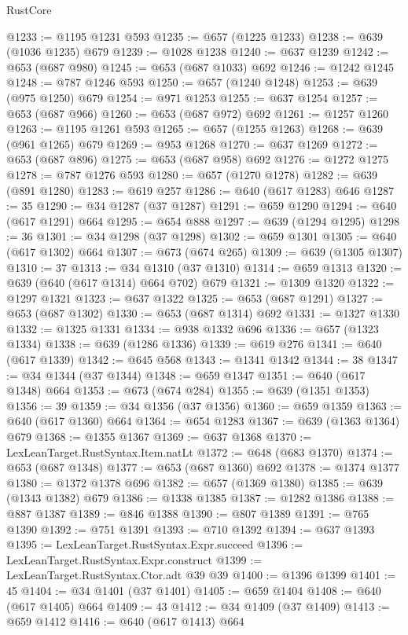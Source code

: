 \begin{lexlean}{RustCore}
\begin{coremodule}
@1233 := @1195 @1231 @593
@1235 := @657 (@1225 @1233)
@1238 := @639 (@1036 @1235) @679
@1239 := @1028 @1238
@1240 := @637 @1239
@1242 := @653 (@687 @980)
@1245 := @653 (@687 @1033) @692
@1246 := @1242 @1245
@1248 := @787 @1246 @593
@1250 := @657 (@1240 @1248)
@1253 := @639 (@975 @1250) @679
@1254 := @971 @1253
@1255 := @637 @1254
@1257 := @653 (@687 @966)
@1260 := @653 (@687 @972) @692
@1261 := @1257 @1260
@1263 := @1195 @1261 @593
@1265 := @657 (@1255 @1263)
@1268 := @639 (@961 @1265) @679
@1269 := @953 @1268
@1270 := @637 @1269
@1272 := @653 (@687 @896)
@1275 := @653 (@687 @958) @692
@1276 := @1272 @1275
@1278 := @787 @1276 @593
@1280 := @657 (@1270 @1278)
@1282 := @639 (@891 @1280)
@1283 := @619 @257
@1286 := @640 (@617 @1283) @646
@1287 := 35
@1290 := @34 @1287 (@37 @1287)
@1291 := @659 @1290
@1294 := @640 (@617 @1291) @664
@1295 := @654 @888
@1297 := @639 (@1294 @1295)
@1298 := 36
@1301 := @34 @1298 (@37 @1298)
@1302 := @659 @1301
@1305 := @640 (@617 @1302) @664
@1307 := @673 (@674 @265)
@1309 := @639 (@1305 @1307)
@1310 := 37
@1313 := @34 @1310 (@37 @1310)
@1314 := @659 @1313
@1320 := @639 (@640 (@617 @1314) @664 @702) @679
@1321 := @1309 @1320
@1322 := @1297 @1321
@1323 := @637 @1322
@1325 := @653 (@687 @1291)
@1327 := @653 (@687 @1302)
@1330 := @653 (@687 @1314) @692
@1331 := @1327 @1330
@1332 := @1325 @1331
@1334 := @938 @1332 @696
@1336 := @657 (@1323 @1334)
@1338 := @639 (@1286 @1336)
@1339 := @619 @276
@1341 := @640 (@617 @1339)
@1342 := @645 @568
@1343 := @1341 @1342
@1344 := 38
@1347 := @34 @1344 (@37 @1344)
@1348 := @659 @1347
@1351 := @640 (@617 @1348) @664
@1353 := @673 (@674 @284)
@1355 := @639 (@1351 @1353)
@1356 := 39
@1359 := @34 @1356 (@37 @1356)
@1360 := @659 @1359
@1363 := @640 (@617 @1360) @664
@1364 := @654 @1283
@1367 := @639 (@1363 @1364) @679
@1368 := @1355 @1367
@1369 := @637 @1368
@1370 := LexLeanTarget.RustSyntax.Item.natLt
@1372 := @648 (@683 @1370)
@1374 := @653 (@687 @1348)
@1377 := @653 (@687 @1360) @692
@1378 := @1374 @1377
@1380 := @1372 @1378 @696
@1382 := @657 (@1369 @1380)
@1385 := @639 (@1343 @1382) @679
@1386 := @1338 @1385
@1387 := @1282 @1386
@1388 := @887 @1387
@1389 := @846 @1388
@1390 := @807 @1389
@1391 := @765 @1390
@1392 := @751 @1391
@1393 := @710 @1392
@1394 := @637 @1393
@1395 := LexLeanTarget.RustSyntax.Expr.succeed
@1396 := LexLeanTarget.RustSyntax.Expr.construct
@1399 := LexLeanTarget.RustSyntax.Ctor.adt @39 @39
@1400 := @1396 @1399
@1401 := 45
@1404 := @34 @1401 (@37 @1401)
@1405 := @659 @1404
@1408 := @640 (@617 @1405) @664
@1409 := 43
@1412 := @34 @1409 (@37 @1409)
@1413 := @659 @1412
@1416 := @640 (@617 @1413) @664

\end{coremodule}
\end{lexlean}
